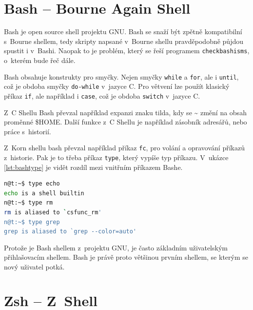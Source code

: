 \documentclass[thesis=M,czech]{FITthesis}[2012/06/26]
\begin{document}

%
%
%
\section{Bash -- Bourne Again Shell}

Bash \cite{bash} \cite{learningthebashshell} \cite{unixprogrammingenvironment} je open source shell projektu GNU. Bash se snaží být zpětně kompatibilní s~Bourne shellem, tedy skripty napsané v~Bourne shellu pravděpodobně půjdou spustit i v~Bashi. Naopak to je problém, který se řeší programem \texttt{checkbashisms}, o~kterém bude řeč dále.

Bash obsahuje konstrukty pro smyčky. Nejen smyčky \texttt{while} a \texttt{for}, ale i \texttt{until}, což je obdoba smyčky \texttt{do-while} v~jazyce C. Pro větvení lze použít klasický příkaz \texttt{if}, ale například i \texttt{case}, což je obdoba \texttt{switch} v~jazyce C.

Z~C Shellu Bash převzal například expanzi znaku tilda, kdy se \textasciitilde{} změní na obsah proměnné \$HOME. Další funkce z~C Shellu je například zásobník adresářů, nebo práce s~historií.

Z~Korn shellu bash převzal například příkaz \texttt{fc}, pro volání a opravování příkazů z~historie. Pak je to třeba příkaz \texttt{type}, který vypíše typ příkazu. V~ukázce \ref{lst:bashtype} je vidět rozdíl mezi vnitřním příkazem Bashe.

\noindent
\begin{minipage}{\linewidth}
\begin{lstlisting}[language=bash, caption={Příkaz type v~Bashi}, label={lst:bashtype}]
n@t:~$ type echo
echo is a shell builtin
n@t:~$ type rm
rm is aliased to `csfunc_rm'
n@t:~$ type grep
grep is aliased to `grep --color=auto'
\end{lstlisting}
\end{minipage}

Protože je Bash shellem z~projektu GNU, je často základním uživatelským přihlašovacím shellem. Bash je právě proto většinou prvním shellem, se kterým se nový uživatel potká.




%
%
%
\section{Zsh -- Z~Shell}
\end{document}
